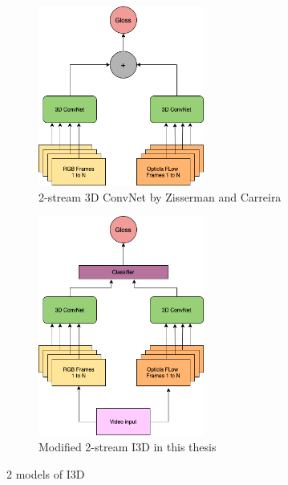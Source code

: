 \documentclass[a4paper, 12pt]{article}
\begin{document}
\begin{figure}[hbt!]
    \centering
    \begin{subfigure}{0.4\textwidth}
        \centering
        \includegraphics[width=0.6\textwidth]{2-stream I3D Model.png}
        \caption{2-stream 3D ConvNet by Zisserman and Carreira \citep{carreira2017quo}}
        \label{Figure 7.a}
    \end{subfigure}
    \hfill
    \begin{subfigure}{0.4\textwidth}
        \centering
        \includegraphics[width=0.6\textwidth]{Modified 2-stream I3D Model.png}
        \caption{Modified 2-stream I3D in this thesis}
        \label{Figure 7.b}
    \end{subfigure}
    \caption{2 models of I3D}
    \label{Figure 7}
\end{figure}



\newpage

\newpage


\end{document}

